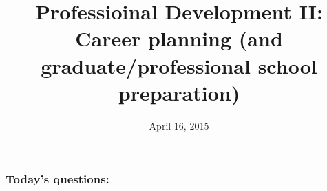 





\title[Professioinal Development II]{Professioinal Development II: Career
    planning (and graduate/professional school preparation)}
\date{April 16, 2015}



\begin{noheadline}
\maketitle
\end{noheadline}


\begin{noheadline}
\begin{frame}
\frametitle{Today's questions:}
\tableofcontents[subsectionstyle=hide]
\end{frame}
\end{noheadline}


